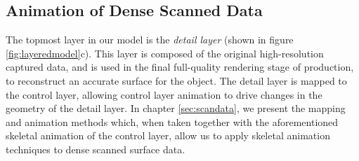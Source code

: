 {\subsection{\label{sec:introduction:layered:scandata}Animation of Dense Scanned Data}
The topmost layer in our model is the {\it detail layer} (shown in figure \ref{fig:layeredmodel}c). This layer is composed of the original high-resolution captured data, and is used in the final full-quality rendering stage of production, to reconstruct an accurate surface for the object. The detail layer is mapped to the control layer, allowing control layer animation to drive changes in the geometry of the detail layer. In chapter \ref{sec:scandata}, we present the mapping and animation methods which, when taken together with the aforementioned skeletal animation of the control layer, allow us to apply skeletal animation techniques to dense scanned surface data. 

}
